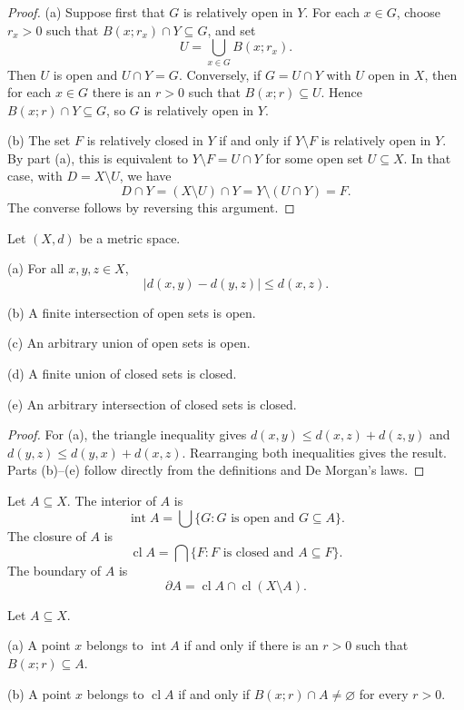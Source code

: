 \begin{proof}
(a) Suppose first that $G$ is relatively open in $Y$. For each $x\in G$, choose
$r_x>0$ such that $B(x;r_x)\cap Y\subseteq G$, and set
\[
U=\bigcup_{x\in G}B(x;r_x).
\]
Then $U$ is open and $U\cap Y=G$. Conversely, if $G=U\cap Y$ with $U$ open in
$X$, then for each $x\in G$ there is an $r>0$ such that $B(x;r)\subseteq U$.
Hence $B(x;r)\cap Y\subseteq G$, so $G$ is relatively open in $Y$.

(b) The set $F$ is relatively closed in $Y$ if and only if $Y\setminus F$ is
relatively open in $Y$. By part (a), this is equivalent to
$Y\setminus F=U\cap Y$ for some open set $U\subseteq X$. In that case,
with $D=X\setminus U$, we have
\[
D\cap Y=(X\setminus U)\cap Y=Y\setminus(U\cap Y)=F.
\]
The converse follows by reversing this argument.
\end{proof}

\begin{thm}
Let $(X,d)$ be a metric space.

(a) For all $x,y,z\in X$,
\[
\bigl|d(x,y)-d(y,z)\bigr|\leq d(x,z).
\]

(b) A finite intersection of open sets is open.

(c) An arbitrary union of open sets is open.

(d) A finite union of closed sets is closed.

(e) An arbitrary intersection of closed sets is closed.
\end{thm}

\begin{proof}
For (a), the triangle inequality gives
$d(x,y)\leq d(x,z)+d(z,y)$ and
$d(y,z)\leq d(y,x)+d(x,z)$. Rearranging both inequalities gives the result.
Parts (b)--(e) follow directly from the definitions and De Morgan's laws.
\end{proof}

\begin{de}
Let $A\subseteq X$. The interior of $A$ is
\[
\operatorname{int}A=\bigcup\{G:G\text{ is open and }G\subseteq A\}.
\]
The closure of $A$ is
\[
\operatorname{cl}A=\bigcap\{F:F\text{ is closed and }A\subseteq F\}.
\]
The boundary of $A$ is
\[
\partial A=\operatorname{cl}A\cap\operatorname{cl}(X\setminus A).
\]
\end{de}

\begin{thm}
Let $A\subseteq X$.

(a) A point $x$ belongs to $\operatorname{int}A$ if and only if there is an
$r>0$ such that $B(x;r)\subseteq A$.

(b) A point $x$ belongs to $\operatorname{cl}A$ if and only if
$B(x;r)\cap A\neq\varnothing$ for every $r>0$.
\end{thm}

